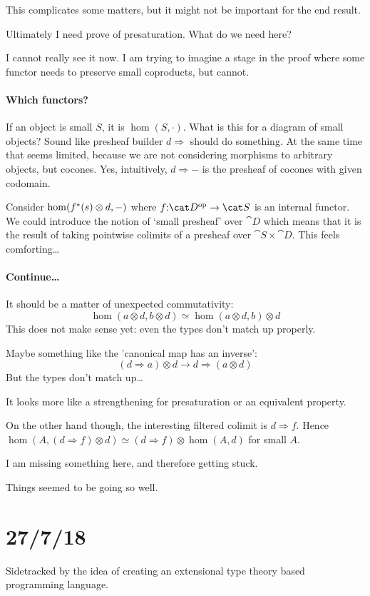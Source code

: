 \documentclass[csh.tex]{subfiles}
\begin{document}
This complicates some matters, but it might not be important for the end result.

Ultimately I need prove of presaturation. What do we need here?

I cannot really see it now. I am trying to imagine a stage in the proof where some functor needs to preserve small coproducts, but cannot.

\paragraph{Which functors?}
If an object is small $S$, it is $\hom(S,\cdot)$. What is this for a diagram of small objects? Sound like presheaf builder $d\Rightarrow$ should do something. At the same time that seems limited, because we are not considering morphisms to arbitrary objects, but cocones. Yes, intuitively, $d\Rightarrow -$ is the presheaf of cocones with given codomain.

Consider $\hom(f^*(s)\otimes d,-)$ where $f\of \cat D\dual\to\cat S$ is an internal functor. We could introduce the notion of `small presheaf' over $\cat D$ which means that it is the result of taking pointwise colimits of a presheaf over $\cat S\times \cat D$. This feels comforting\dots

\paragraph{Continue\dots}
It should be a matter of unexpected commutativity:
\[ \hom(a\otimes d,b\otimes d) \simeq \hom(a\otimes d, b)\otimes d \]
This does not make sense yet: even the types don't match up properly.

Maybe something like the 'canonical map has an inverse':
\[ (d\Rightarrow a)\otimes d \to d\Rightarrow(a\otimes d) \]
But the types don't match up\dots

It looks more like a strengthening for presaturation or an equivalent property.

On the other hand though, the interesting filtered colimit is $d\Rightarrow f$. Hence $\hom(A,(d\Rightarrow f)\otimes d) \simeq (d\Rightarrow f)\otimes \hom(A,d)$ for small $A$. 

I am missing something here, and therefore getting stuck.

Things seemed to be going so well.



\section{27/7/18}
Sidetracked by the idea of creating an extensional type theory based programming language.
\end{document}

